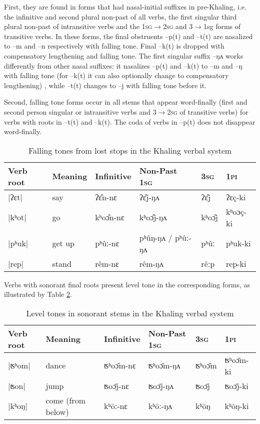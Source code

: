 \documentclass[oldfontcommands,oneside,a4paper,11pt]{article}
\newcommand{\ipa}[1]{{\phon \mbox{#1}}} %
\begin{document}
 First, they are found  in forms that had nasal-initial suffixes in pre-Khaling, i.e. the infinitive and second plural non-past of all verbs, the first singular third plural non-past of intransitive verbs  and the   \textsc{1sg$\rightarrow$2sg} and {3$\rightarrow$1sg} forms of transitive verbs. In these forms, the final obstruents \ipa{--p(t)} and  \ipa{--t(t)} are nasalized to \ipa{--m} and \ipa{--n} respectively with falling tone. Final \ipa{--k(t)} is dropped with compensatory lengthening and falling tone. The first singular suffix \ipa{--ŋʌ} works differently from other nasal suffixes:  it nasalizes \ipa{--p(t)} and   \ipa{--k(t)} to \ipa{--m} and \ipa{--ŋ} with falling tone (for  \ipa{--k(t)}  it can also optionally change to compensatory lengthening) , while \ipa{--t(t)} changes to \ipa{--j} with falling tone before it.
 
 Second, falling tone forms occur in all stems that appear word-finally (first and second person singular or intransitive verbs and \textsc{3$\rightarrow$2sg} of transitive verbs) for verbs with roots in \ipa{--t(t)} and   \ipa{--k(t)}. The coda of verbs in \ipa{--p(t)} does not disappear word-finally.

\begin{table}[H]
\caption{Falling tones from lost stops in the Khaling verbal system} \centering \label{tab:falling.verb}
\begin{tabular}{llllll}
\toprule
Verb root	&Meaning	&Infinitive  & Non-Past \textsc{1sg} &  \textsc{3sg} &  \textsc{1pi}\\
\midrule
|ʔɛt|	&	say			&\ipa{ʔɛ̂n-nɛ}		&\ipa{ʔɛ̂j-ŋʌ}	&\ipa{ʔɛ̂j} &\ipa{ʔɛç-ki} \\
|kʰot|	&	go		&\ipa{kʰoɔ̂n-nɛ}		&\ipa{kʰoɔ̂j-ŋʌ}&\ipa{kʰoɔ̂j} &\ipa{kʰoɔç-ki} \\
|pʰuk|	&	get up			&\ipa{pʰûː-nɛ}&\ipa{pʰûŋ-ŋʌ} / \ipa{pʰûː-ŋʌ}	&\ipa{pʰûː} &\ipa{pʰuk-ki} \\
|rep|	&	stand		&\ipa{rêm-nɛ}		&\ipa{rêm-ŋʌ}&\ipa{rêːp} &\ipa{rep-ki} \\
\bottomrule
\end{tabular}
\end{table}

Verbs with sonorant final roots present level tone in the corresponding forms, as illustrated by Table \ref{tab:level.verb}.


\begin{table}[H]
\caption{Level tones in sonorant stems in the Khaling verbal system} \centering \label{tab:level.verb}
\begin{tabular}{llllll}
\toprule
Verb root	&Meaning	&Infinitive  & Non-Past \textsc{1sg} &  \textsc{3sg} &  \textsc{1pi}\\
\midrule
|ʦʰom|	&	dance		&\ipa{ʦʰoɔ̄m-nɛ}		&\ipa{ʦʰoɔ̄m-ŋʌ}&\ipa{ʦʰoɔ̄m} &\ipa{ʦʰoɔ̄m-ki} \\
|ʦon|	&	jump		&\ipa{ʦoɔ̄j-nɛ}		&\ipa{ʦoɔ̄j-ŋʌ}&\ipa{ʦoɔ̄j} &\ipa{ʦoɔ̄j-ki} \\
|kʰoŋ|	&	come (from below)		&\ipa{kʰōː-nɛ}		&\ipa{kʰōː-ŋʌ}&\ipa{kʰōŋ} &\ipa{kʰōŋ-ki} \\
\bottomrule
\end{tabular}
\end{table}
\end{document}
